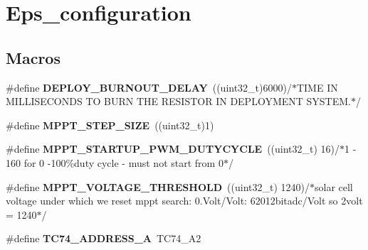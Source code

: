 \hypertarget{group__eps__configuration}{\section{Eps\-\_\-configuration}
\label{group__eps__configuration}
}
\subsection*{Macros}
\begin{DoxyCompactItemize}
\item 
\hypertarget{group__eps__configuration_ga2c4649c0bbd681a7529df7919b75e0f5}{\#define {\bfseries D\-E\-P\-L\-O\-Y\-\_\-\-B\-U\-R\-N\-O\-U\-T\-\_\-\-D\-E\-L\-A\-Y}~((uint32\-\_\-t)6000)/$\ast$T\-I\-M\-E I\-N M\-I\-L\-L\-I\-S\-E\-C\-O\-N\-D\-S T\-O B\-U\-R\-N T\-H\-E R\-E\-S\-I\-S\-T\-O\-R I\-N D\-E\-P\-L\-O\-Y\-M\-E\-N\-T S\-Y\-S\-T\-E\-M.$\ast$/}\label{group__eps__configuration_ga2c4649c0bbd681a7529df7919b75e0f5}

\item 
\hypertarget{group__eps__configuration_ga83f774b2ae08a536037412597fa4c947}{\#define {\bfseries M\-P\-P\-T\-\_\-\-S\-T\-E\-P\-\_\-\-S\-I\-Z\-E}~((uint32\-\_\-t)1)}\label{group__eps__configuration_ga83f774b2ae08a536037412597fa4c947}

\item 
\hypertarget{group__eps__configuration_ga9efa4c317bf3e575acb0b5c50d39a67f}{\#define {\bfseries M\-P\-P\-T\-\_\-\-S\-T\-A\-R\-T\-U\-P\-\_\-\-P\-W\-M\-\_\-\-D\-U\-T\-Y\-C\-Y\-C\-L\-E}~((uint32\-\_\-t) 16)/$\ast$1 -\/ 160 for 0 -\/100\%duty cycle -\/ must not start from 0$\ast$/}\label{group__eps__configuration_ga9efa4c317bf3e575acb0b5c50d39a67f}

\item 
\hypertarget{group__eps__configuration_ga1a58bf9d62dd0f901a25c1acc8fda35a}{\#define {\bfseries M\-P\-P\-T\-\_\-\-V\-O\-L\-T\-A\-G\-E\-\_\-\-T\-H\-R\-E\-S\-H\-O\-L\-D}~((uint32\-\_\-t) 1240)/$\ast$solar cell voltage under which we reset mppt search\-: 0.\-Volt/\-Volt\-: 62012bitadc/\-Volt so 2volt = 1240$\ast$/}\label{group__eps__configuration_ga1a58bf9d62dd0f901a25c1acc8fda35a}

\item 
\hypertarget{group__eps__configuration_ga0e67fdf46bbbdf4c1f8a0e6ce2bc6567}{\#define {\bfseries T\-C74\-\_\-\-A\-D\-D\-R\-E\-S\-S\-\_\-\-A}~T\-C74\-\_\-\-A2}\label{group__eps__configuration_ga0e67fdf46bbbdf4c1f8a0e6ce2bc6567}


\end{DoxyCompactItemize}
